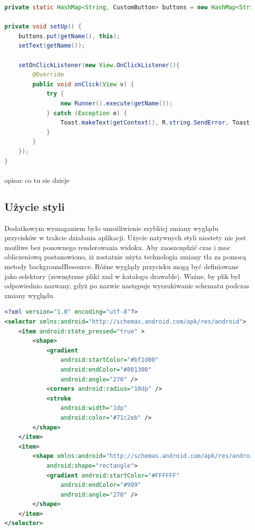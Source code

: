 \begin{lstlisting}[language=Java]
private static HashMap<String, CustomButton> buttons = new HashMap<String, CustomButton>();

private void setUp() {
    buttons.put(getName(), this);
    setText(getName());

    setOnClickListener(new View.OnClickListener(){
        @Override
        public void onClick(View v) {
            try {
                new Runner().execute(getName());
            } catch (Exception e) {
                Toast.makeText(getContext(), R.string.SendError, Toast.LENGTH_SHORT).show();
            }
        }
    });
}
\end{lstlisting}
\paragraph{}
{\color{red}opisac co tu sie dzieje}


\subsection{Użycie styli}
\paragraph{}
Dodatkowym wymaganiem było umożliwienie szybkiej zmiany wyglądu przycisków w trakcie działania aplikacji. Użycie natywnych styli niestety nie jest możliwe bez ponownego renderowania widoku. Aby zaoszczędzić czas i moc obliczeniową postanowiono, iż zostatnie użyta technologia zmiany tła za pomocą metody backgroundResource. Różne wyglądy przycisku mogą być definiowane jako selektory (zewnętrzne pliki xml w katalogu drawable). Ważne, by plik był odpowiednio nazwany, gdyż po nazwie następuje wyszukiwanie schematu podczas zmiany wyglądu.

\begin{lstlisting}[language=Xml]
<?xml version="1.0" encoding="utf-8"?>
<selector xmlns:android="http://schemas.android.com/apk/res/android">
    <item android:state_pressed="true" >
        <shape>
            <gradient
                android:startColor="#bf1d00"
                android:endColor="#801300"
                android:angle="270" />
            <corners android:radius="10dp" />
            <stroke
                android:width="1dp"
                android:color="#71c2eb" />
        </shape>
    </item>
    <item>
        <shape xmlns:android="http://schemas.android.com/apk/res/android"
            android:shape="rectangle">
            <gradient android:startColor="#FFFFFF"
                android:endColor="#999"
                android:angle="270" />
        </shape>
    </item>
</selector>
\end{lstlisting}
